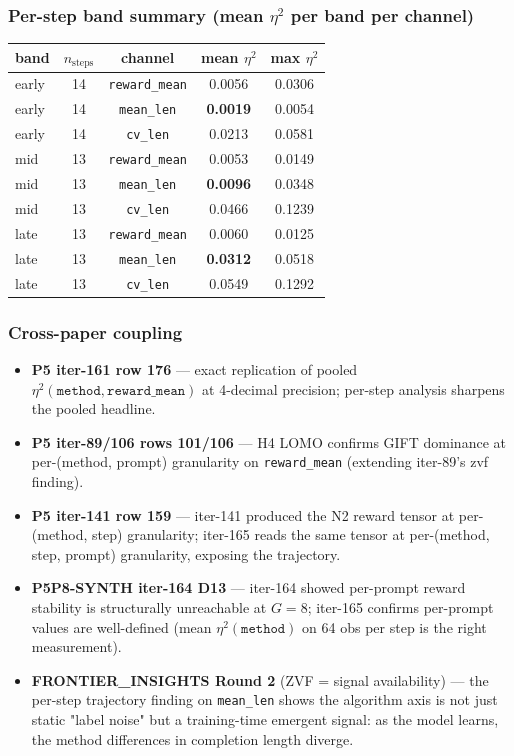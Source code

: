 \documentclass{article}  \usepackage[preprint,nonatbib]{neurips_2026} \usepackage[numbers]{natbib}
\begin{document}
\subsubsection{Per-step band summary (mean $\eta^2$ per band per channel)}
\begin{tabular}{lcccc}
\hline
band & $n_{\mathrm{steps}}$ & channel & mean $\eta^2$ & max $\eta^2$ \\
\hline
early & 14 & \texttt{reward\_mean} & 0.0056 & 0.0306 \\
early & 14 & \texttt{mean\_len}     & \textbf{0.0019} & 0.0054 \\
early & 14 & \texttt{cv\_len}       & 0.0213 & 0.0581 \\
mid   & 13 & \texttt{reward\_mean} & 0.0053 & 0.0149 \\
mid   & 13 & \texttt{mean\_len}     & \textbf{0.0096} & 0.0348 \\
mid   & 13 & \texttt{cv\_len}       & 0.0466 & 0.1239 \\
late  & 13 & \texttt{reward\_mean} & 0.0060 & 0.0125 \\
late  & 13 & \texttt{mean\_len}     & \textbf{0.0312} & 0.0518 \\
late  & 13 & \texttt{cv\_len}       & 0.0549 & 0.1292 \\
\hline
\end{tabular}

\subsubsection{Cross-paper coupling}
\begin{itemize}
\item \textbf{P5 iter-161 row 176} --- exact replication of pooled $\eta^2(\texttt{method}, \texttt{reward\_mean})$ at 4-decimal precision; per-step analysis sharpens the pooled headline.
\item \textbf{P5 iter-89/106 rows 101/106} --- H4 LOMO confirms GIFT dominance at per-(method, prompt) granularity on \texttt{reward\_mean} (extending iter-89's zvf finding).
\item \textbf{P5 iter-141 row 159} --- iter-141 produced the N2 reward tensor at per-(method, step) granularity; iter-165 reads the same tensor at per-(method, step, prompt) granularity, exposing the trajectory.
\item \textbf{P5P8-SYNTH iter-164 D13} --- iter-164 showed per-prompt reward stability is structurally unreachable at $G{=}8$; iter-165 confirms per-prompt values are well-defined (mean $\eta^2(\texttt{method})$ on 64 obs per step is the right measurement).
\item \textbf{FRONTIER\_INSIGHTS Round 2} (ZVF = signal availability) --- the per-step trajectory finding on \texttt{mean\_len} shows the algorithm axis is not just static "label noise" but a training-time emergent signal: as the model learns, the method differences in completion length diverge.
\end{itemize}
\end{document}
